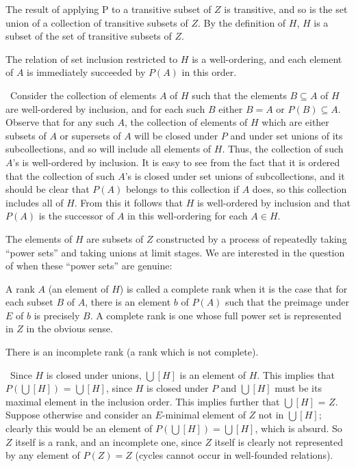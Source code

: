\preuve The result of applying P to a transitive subset of
$Z$ is transitive, and so is the set union of a collection of
transitive subsets of $Z$.  By the definition of $H$, $H$ is a
subset of the set of transitive subsets of $Z$.
\finpreuve

\begin{lemme}
 The relation of set inclusion restricted to $H$ is a
 well-ordering, and each element of $A$ is immediately
 succeeded by $P(A)$ in this order.
\end{lemme}

\preuve\ Consider the collection of elements $A$ of $H$
such that the elements $B \subseteq A$ of $H$ are well-ordered by
inclusion, and for each such $B$ either $B=A$ or $P(B) \subseteq A$.
Observe that for any such $A$, the collection of elements of $H$
which are either subsets of $A$ or supersets of $A$ will be closed
under $P$ and under set unions of its subcollections, and so
will include all elements of $H$.  Thus, the collection of such $A$'s is
well-ordered by inclusion.  It is easy
to see from the fact that it 
is ordered that the collection of such $A$'s is closed under set
unions of subcollections, and it should be clear that $P(A)$ belongs
to this collection if $A$ does, so this collection includes all of
$H$.  From this it follows that $H$ is well-ordered by inclusion and
that $P(A)$ is the successor of $A$ in this well-ordering for each
$A \in H$.
\finpreuve

The elements of $H$ are subsets of $Z$ constructed by a process of
repeatedly taking ``power sets'' and taking
unions at limit stages.
We are interested in the question of when these ``power sets'' are
genuine:

\begin{definition}
 A rank $A$ (an element of $H$) is called a {\upshape
 complete rank} when it is the case that for each subset $B$ of
 $A$, there is an element $b$ of $P(A)$ such that the preimage
 under $E$ of $b$ is precisely $B$.  A complete rank is one whose
 full power set is represented in $Z$ in the obvious sense.
\end{definition}

\begin{lemme}
 There is an incomplete rank (a rank which is not complete).
\end{lemme}

\preuve\ Since $H$ is closed under unions, $\bigcup[H]$ is an
element of $H$.  This implies that $P(\bigcup[H])$ = $\bigcup[H]$,
since $H$ is closed under $P$ and $\bigcup[H]$ must be its maximal
element in the inclusion order.  This implies further that
$\bigcup[H]$ = $Z$.  Suppose otherwise and consider an $E$-minimal
element of $Z$ not in $\bigcup[H]$; clearly this would be an element
of $P(\bigcup[H])= \bigcup[H]$, which is absurd.  So $Z$ itself is a
rank, and an incomplete one, since $Z$ itself is clearly not
represented by any element of $P(Z) = Z$ (cycles cannot occur in
well-founded relations).
\finpreuve


